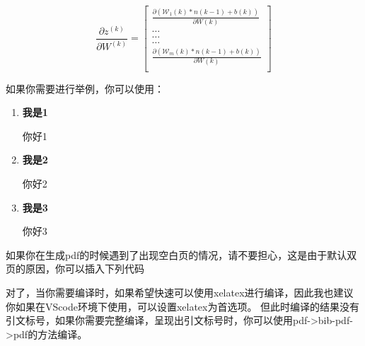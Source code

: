 \begin{equation}
    \frac{\partial z^{(k)}}{\partial W^{(k)}}=
    \left[
        \begin{array}{c}
            \frac{\partial(\mathcal{W}_1(k)*n(k-1)+b(k))}{\partial W(k)} \\
            \dots \\
            \dots \\
            \dots \\
            \frac{\partial(\mathcal{W}_m(k)*n(k-1)+b(k))}{\partial W(k)} \\
        \end{array}
    \right]
\end{equation}

如果你需要进行举例，你可以使用：
\begin{enumerate}
    \item \textbf{我是1}
    
    你好1
    \item \textbf{我是2}
    
    你好2
    \item \textbf{我是3}
    
    你好3
\end{enumerate}

如果你在生成pdf的时候遇到了出现空白页的情况，请不要担心，这是由于默认双页的原因，你可以插入下列代码
\let\cleardoublepage\clearpage

对了，当你需要编译时，如果希望快速可以使用xelatex进行编译，因此我也建议你如果在VScode环境下使用，可以设置xelatex为首选项。
但此时编译的结果没有引文标号，如果你需要完整编译，呈现出引文标号时，你可以使用pdf->bib-pdf->pdf的方法编译。